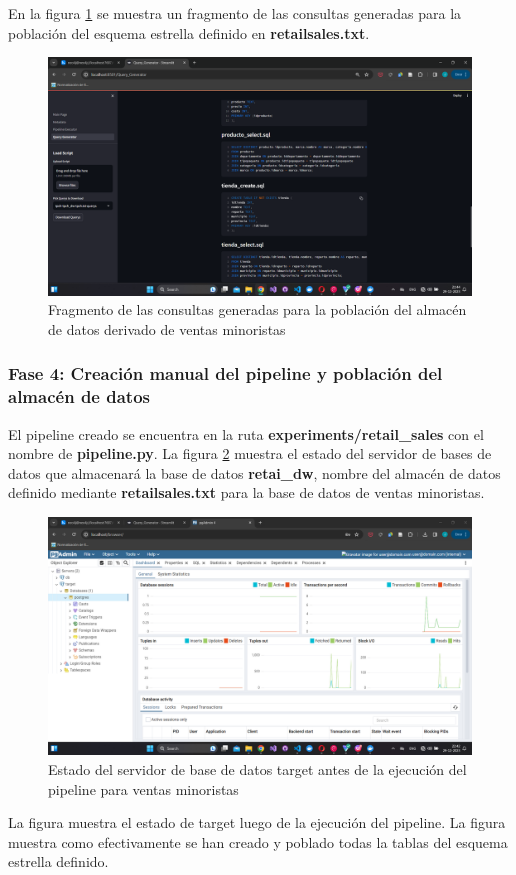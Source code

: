En la figura \ref{fig:codegen1} se muestra un fragmento de las consultas generadas para la poblaci\'on del esquema 
estrella definido en \textbf{retailsales.txt}.

\begin{figure}
  \centering
  \includegraphics[scale=0.4]{Graphics/generatedquerys1.png}
  \caption{Fragmento de las consultas generadas para la poblaci\'on del almac\'en de datos derivado de ventas minoristas}
  \label{fig:codegen1}
\end{figure}

\subsubsection{Fase 4: Creaci\'on manual del pipeline y poblaci\'on del almac\'en de datos}

El pipeline creado se encuentra en la ruta \textbf{experiments/retail\_sales} con el nombre de 
\textbf{pipeline.py}. La figura \ref{fig:emptypgadmin1} muestra el estado del servidor de bases de 
datos que almacenar\'a la base de datos \textbf{retai\_dw}, nombre del almac\'en de datos definido mediante 
\textbf{retailsales.txt} para la base de datos de ventas minoristas.

\begin{figure}
  \centering
  \includegraphics[scale=0.4]{Graphics/emptypgadmin1.png}
  \caption{Estado del servidor de base de datos target antes de la ejecuci\'on del pipeline para ventas minoristas}
  \label{fig:emptypgadmin1}
\end{figure}

La figura  muestra el estado de target luego de la ejecuci\'on del pipeline. La figura muestra como efectivamente 
se han creado y poblado todas la tablas del esquema estrella definido.

